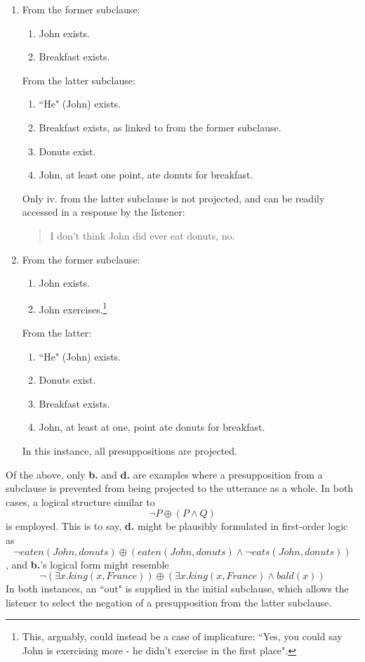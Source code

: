 \documentclass[12pt,a4paper]{article}
\begin{document}
\begin{enumerate}
\begin{enumerate}
\item
From the former subclause:
\begin{enumerate}
\item John exists.
\item Breakfast exists.
\end{enumerate}
From the latter subclause:
\begin{enumerate}
\item ``He" (John) exists.
\item Breakfast exists, as linked to from the former subclause.
\item Donuts exist.
\item John, at least one point, ate donuts for breakfast.
\end{enumerate}
Only iv. from the latter subclause is not projected, and can be readily accessed in a response by the listener:
\begin{quote}
I don't think John did ever eat donuts, no.
\end{quote} 

\item
From the former subclause:
\begin{enumerate}
\item John exists.
\item John exercises.\footnote{This, arguably, could instead be a case of implicature: ``Yes, you could say John is exercising more - he didn't exercise in the first place".}
\end{enumerate}
From the latter:
\begin{enumerate}
\item ``He" (John) exists.
\item Donuts exist.
\item Breakfast exists.
\item John, at least at one, point ate donuts for breakfast.
\end{enumerate}
In this instance, all presuppositions are projected.

\end{enumerate}
Of the above, only \textbf{b.} and \textbf{d.} are examples where a presupposition from a subclause is prevented from being projected to the utterance as a whole. In both cases, a logical structure similar to 
\[
\neg P \oplus (P \wedge Q)
\]
is employed. This is to say, \textbf{d.} might be plausibly formulated in first-order logic as
\[
\neg eaten(John, donuts) \oplus (eaten(John, donuts) \wedge \neg eats(John, donuts))
\],
and \textbf{b.}'s logical form might resemble
\[
\neg (\exists x. king(x, France)) \oplus (\exists x. king(x, France) \wedge bald(x))
\]
In both instances, an ``out" is supplied in the initial subclause, which allows the listener to select the negation of a presupposition from the latter subclause.

\end{enumerate}
\end{document}
